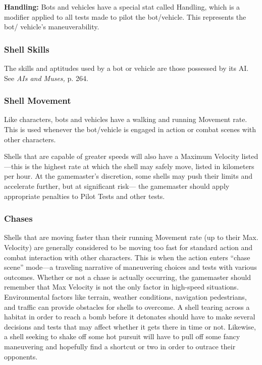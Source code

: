 \textbf{Handling:} Bots and vehicles have a 
special stat called Handling, which is a 
modifier applied to all tests made to pilot 
the bot/vehicle. This represents the bot/
vehicle's maneuverability.

\subsubsection{Shell Skills}

The skills and aptitudes used by a bot or 
vehicle are those possessed by its AI. See 
\textit{AIs and Muses,} p. 264.

\subsubsection{Shell Movement}

Like characters, bots and vehicles have 
a walking and running Movement rate. 
This is used whenever the bot/vehicle is 
engaged in action or combat scenes with 
other characters.

Shells that are capable of greater speeds 
will also have a Maximum Velocity 
listed—this is the highest rate at which the 
shell may safely move, listed in kilometers 
per hour. At the gamemaster's discretion, 
some shells may push their limits and 
accelerate further, but at significant risk—
the gamemaster should apply appropriate 
penalties to Pilot Tests and other tests.

\subsubsection{Chases}

Shells that are moving faster than their 
running Movement rate (up to their Max. 
Velocity) are generally considered to be 
moving too fast for standard action and combat interaction
with other characters. This is when the action
enters ``chase scene'' mode—a traveling narrative of 
maneuvering choices and tests with various outcomes. 
Whether or not a chase is actually occurring, the 
gamemaster should remember that Max Velocity is 
not the only factor in high-speed situations. Environmental
factors like terrain, weather conditions, navigation
pedestrians, and traffic can provide obstacles
for shells to overcome. A shell tearing across a habitat 
in order to reach a bomb before it detonates should 
have to make several decisions and tests that may 
affect whether it gets there in time or not. Likewise, a 
shell seeking to shake off some hot pursuit will have 
to pull off some fancy maneuvering and hopefully find 
a shortcut or two in order to outrace their opponents.

